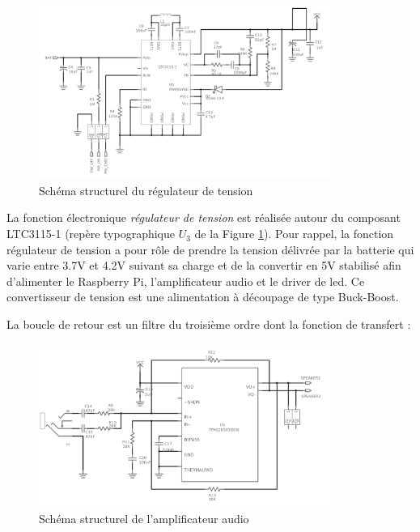 \begin{figure}[H]
    \centerline{
        \includegraphics[width=0.85\textwidth,fbox]{img/ElecSch_BuckBoost}
    }
    \caption{Schéma structurel du régulateur de tension}
    \label{ElecSch_BuckBoost}
\end{figure}

    La fonction électronique \emph{régulateur de tension} est réalisée autour du composant LTC3115-1 (repère typographique $U_3$ de la Figure \ref{ElecSch_BuckBoost}).
    Pour rappel, la fonction régulateur de tension a pour rôle de prendre la tension délivrée par la batterie qui varie entre 3.7V et 4.2V suivant sa charge et de la convertir en 5V stabilisé afin d'alimenter le Raspberry Pi, l'amplificateur audio et le driver de led.
    Ce convertisseur de tension est une alimentation à découpage de type Buck-Boost.
    
    La boucle de retour est un filtre du troisième ordre dont la fonction de transfert :
    

\begin{figure}[H]
    \centerline{
        \includegraphics[width=0.85\textwidth,fbox]{img/ElecSch_AudioAmp}
    }
    \caption{Schéma structurel de l'amplificateur audio}
    \label{ElecSch_AudioAmp}
\end{figure}

